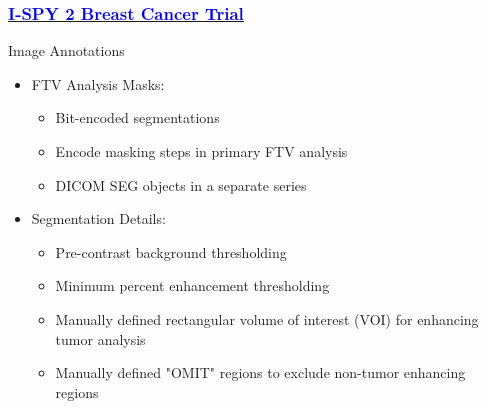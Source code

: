 \documentclass{beamer}
\begin{document}
    \begin{frame}
        \frametitle{ \href{https://nbia.cancerimagingarchive.net/viewer/?study=1.3.6.1.4.1.14519.5.2.1.296160879836167288241026943725310014603&series=1.3.6.1.4.1.14519.5.2.1.146922122261172320578401952552745618812&token=3ca5b192-1ca8-45cc-95c8-84221a74936f}{\underline{\textcolor{blue}{I-SPY 2 Breast Cancer Trial}}}}
        \begin{block}{Image Annotations}
            \begin{itemize}
                \item FTV Analysis Masks:
                    \begin{itemize}
                        \item Bit-encoded segmentations
                        \item Encode masking steps in primary FTV analysis
                        \item DICOM SEG objects in a separate series
                    \end{itemize}
                \item Segmentation Details:
                    \begin{itemize}
                        \item Pre-contrast background thresholding
                        \item Minimum percent enhancement thresholding
                        \item Manually defined rectangular volume of interest (VOI) for enhancing tumor analysis
                        \item Manually defined "OMIT" regions to exclude non-tumor enhancing regions
                    \end{itemize}
            \end{itemize}
        \end{block}
    \end{frame}
\end{document}
